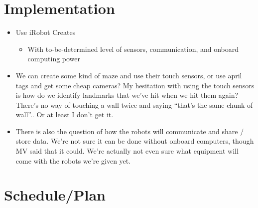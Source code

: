 \documentclass[11pt]{article}
\begin{document}
\section{Implementation}

\begin{itemize}
    \item Use iRobot Creates
        \begin{itemize}
            \item With to-be-determined level of sensors, communication, and onboard computing power
        \end{itemize}

    \item We can create some kind of maze and use their touch sensors, or use april tags and get some cheap cameras? My hesitation with using the touch sensors is how do we identify landmarks that we've hit when we hit them again? There's no way of touching a wall twice and saying ``that's the same chunk of wall''.. Or at least I don't get it.

    \item There is also the question of how the robots will communicate and share / store data.  We're not sure it can be done without onboard computers, though MV said that it could.  We're actually not even sure what equipment will come with the robots we're given yet.  

\end{itemize}

\section{Schedule/Plan}
\end{document}
